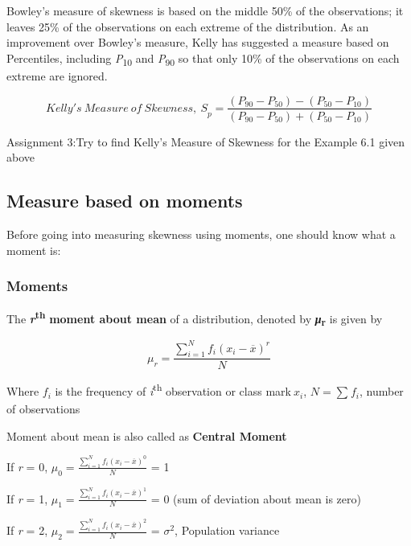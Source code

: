 \documentclass[
]{book}
\begin{document}
Bowley's measure of skewness is based on the middle 50\% of the observations; it leaves 25\% of the observations on each extreme of the distribution. As an improvement over Bowley's measure, Kelly has suggested a measure based on Percentiles, including \emph{P}\textsubscript{10} and \emph{P}\textsubscript{90} so that only 10\% of the observations on each extreme are ignored.

\[{Kelly's\ Measure\ of\ Skewness,\ S}_{p} = \frac{\left( P_{90} - P_{50} \right) - \left( P_{50} - P_{10} \right)}{\left( P_{90} - P_{50} \right) + \left( P_{50} - P_{10} \right)}\]

\begin{rmdnote}
Assignment 3:Try to find Kelly's Measure of Skewness
for the Example 6.1 given above
\end{rmdnote}

\subsection{Measure based on moments}\label{measure-based-on-moments}

Before going into measuring skewness using moments, one should know what a moment is:

\subsubsection{Moments}\label{moments}

The \textbf{\emph{r}}\textsuperscript{\textbf{th}} \textbf{moment about mean} of a distribution, denoted by \textbf{\emph{μ}}\textsubscript{\textbf{r}} is given by

\[\mu_{r} = \frac{\sum_{i = 1}^{N}{f_{i}\left( x_{i} - \overline{x} \right)^{r}}}{N}\]

Where \(f_{i}\) is the frequency of \emph{i}\textsuperscript{th} observation or class mark\(\ x_{i}\), \(N = \sum_{}^{}f_{i}\), number of observations

Moment about mean is also called as \textbf{Central Moment}

If \emph{r} = 0, \(\mu_{0} = \frac{\sum_{i = 1}^{N}{f_{i}\left( x_{i} - \overline{x} \right)^{0}}}{N}\) = 1

If \emph{r} = 1, \(\mu_{1} = \frac{\sum_{i = 1}^{N}{f_{i}\left( x_{i} - \overline{x} \right)^{1}}}{N}\) = 0 (sum of deviation about mean is zero)

If \emph{r} = 2, \(\mu_{2} = \frac{\sum_{i = 1}^{N}{f_{i}\left( x_{i} - \overline{x} \right)^{2}}}{N}\) = \(\sigma^{2}\), Population variance
\end{document}
